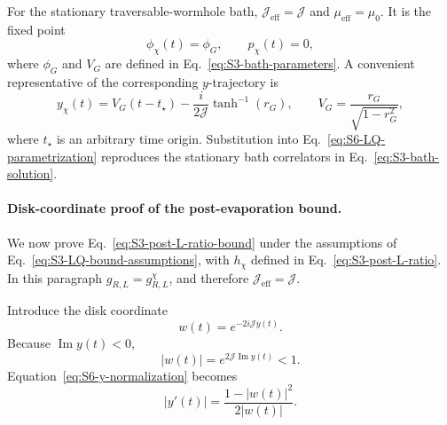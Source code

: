\documentclass[11pt,a4paper]{article}
\begin{document}
For the stationary traversable-wormhole bath,
\(\mathcal J_{\mathrm{eff}}=\mathcal J\) and
\(\mu_{\mathrm{eff}}=\mu_0\). It is the fixed point
\begin{equation}
\phi_\chi(t)=\phi_G,
\qquad
p_\chi(t)=0,
\label{eq:S6-chi-fixed-point}
\end{equation}
where \(\phi_G\) and \(V_G\) are defined in
Eq.~\eqref{eq:S3-bath-parameters}. A convenient representative of the
corresponding \(y\)-trajectory is
\begin{equation}
y_\chi(t)
=
V_G(t-t_\star)
-
\frac{i}{2\mathcal J}
\tanh^{-1}(r_G),
\qquad
V_G
=
\frac{r_G}{\sqrt{1-r_G^2}},
\label{eq:S6-chi-trajectory}
\end{equation}
where \(t_\star\) is an arbitrary time origin. Substitution into
Eq.~\eqref{eq:S6-LQ-parametrization} reproduces the stationary bath
correlators in Eq.~\eqref{eq:S3-bath-solution}.

\paragraph*{Disk-coordinate proof of the post-evaporation bound.}

We now prove Eq.~\eqref{eq:S3-post-L-ratio-bound} under the assumptions of
Eq.~\eqref{eq:S3-LQ-bound-assumptions}, with \(h_\chi\) defined in
Eq.~\eqref{eq:S3-post-L-ratio}. In this paragraph
\(g_{R,L}=g^\chi_{R,L}\), and therefore
\(\mathcal J_{\mathrm{eff}}=\mathcal J\).

Introduce the disk coordinate
\begin{equation}
w(t)
=
e^{-2i\mathcal J y(t)}.
\label{eq:S6-disk-coordinate}
\end{equation}
Because \(\operatorname{Im}y(t)<0\),
\begin{equation}
|w(t)|
=
e^{2\mathcal J\operatorname{Im}y(t)}
<1 .
\label{eq:S6-disk-interior}
\end{equation}
Equation~\eqref{eq:S6-y-normalization} becomes
\begin{equation}
|y'(t)|
=
\frac{
1-|w(t)|^2
}{
2|w(t)|
}.
\label{eq:S6-yprime-disk}
\end{equation}
\end{document}

